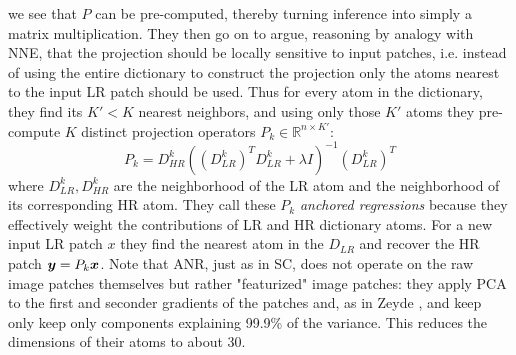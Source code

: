 we see that $P$ can be pre-computed, thereby turning inference into simply a matrix multiplication.
%
They then go on to argue, reasoning by analogy with NNE, that the projection should be locally sensitive to input patches, i.e. instead of using the entire dictionary to construct the projection only the atoms nearest to the input LR patch should be used.
%
Thus for every atom in the dictionary, they find its $K' < K$ nearest neighbors, and using only those $K'$ atoms they pre-compute $K$ distinct projection operators $P_k \in \mathbb{R}^{n \times K'}$:
\begin{equation}
    P_k = D_{HR}^k \left( (D_{LR}^k)^T D_{LR}^k + \lambda I\right)^{-1}(D_{LR}^k)^T
    \label{eqn:datadependentmapping}
\end{equation}
where $D_{LR}^k, D_{HR}^k$ are the neighborhood of the LR atom and the neighborhood of its corresponding HR atom.
%
They call these $P_k$ \textit{anchored regressions} because they effectively weight the contributions of LR and HR dictionary atoms.
%
For a new input LR patch $x$ they find the nearest atom in the $D_{LR}$ and recover the HR patch $\bm{y} = P_k \bm{x}$.
%
Note that ANR, just as in SC, does not operate on the raw image patches themselves but rather "featurized" image patches: they apply PCA to the first and seconder gradients of the patches and, as in Zeyde \etal\cite{Zeyde2012}, and keep only keep only components explaining 99.9\% of the variance.
%
This reduces the dimensions of their atoms to about 30.

